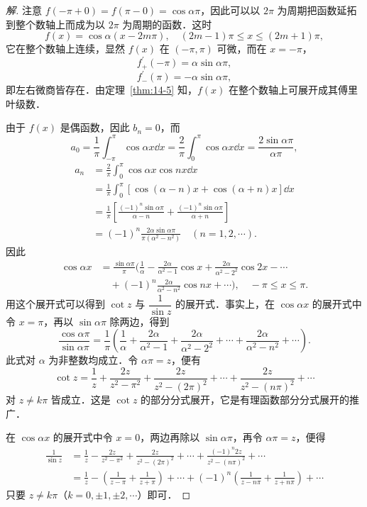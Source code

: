 \begin{proof}[解]
注意 $f(-\pi+0)=f(\pi-0)=\cos\alpha\pi$，因此可以以 $2\pi$ 为周期把函数延拓到整个数轴上而成为以 $2\pi$ 为周期的函数．这时
\[
f(x)=\cos\alpha(x-2m\pi),\quad(2m-1)\pi\leqslant x\leqslant(2m+1)\pi,
\]
它在整个数轴上连续，显然 $f(x)$ 在 $(-\pi,\pi)$ 可微，而在 $x=-\pi$，
\[
f_{+}^{\prime}(-\pi)=\alpha\sin\alpha\pi,
\]
\[
f_{-}^{\prime}(\pi)=-\alpha\sin\alpha\pi,
\]
即左右微商皆存在．由定理~\ref{thm:14-5} 知，$f(x)$ 在整个数轴上可展开成其傅里叶级数．

由于 $f(x)$ 是偶函数，因此 $b_{n}=0$，而
\[
a_{0}=\frac{1}{\pi}\int_{-\pi}^{\pi}\cos\alpha x\dd x=\frac{2}{\pi}\int_{0}^{\pi}\cos\alpha x\dd x=\frac{2\sin\alpha\pi}{\alpha\pi},
\]
\[
\begin{aligned}
a_{n}&=\frac{2}{\pi}\int_{0}^{\pi}\cos\alpha x\cos nx\dd x\\
&=\frac{1}{\pi}\int_{0}^{\pi}\left[\cos(\alpha-n)x+\cos(\alpha+n)x\right]\dd x\\
&=\frac{1}{\pi}\left[\frac{(-1)^{n}\sin\alpha\pi}{\alpha-n}+\frac{(-1)^{n}\sin\alpha\pi}{\alpha+n}\right]\\
&=(-1)^{n}\frac{2\alpha\sin\alpha\pi}{\pi(\alpha^{2}-n^{2})}\quad(n=1,2,\cdots).
\end{aligned}
\]
因此
\[
\begin{aligned}
\cos\alpha x&=\frac{\sin\alpha\pi}{\pi}\Bigg(\frac{1}{\alpha}-\frac{2\alpha}{\alpha^{2}-1}\cos x+\frac{2\alpha}{\alpha^{2}-2^{2}}\cos 2x-\cdots\\
&\quad+(-1)^{n}\frac{2\alpha}{\alpha^{2}-n^{2}}\cos nx+\cdots\Bigg),\quad-\pi\leqslant x\leqslant\pi.
\end{aligned}
\]
用这个展开式可以得到 $\cot z$ 与 $\dfrac{1}{\sin z}$ 的展开式．事实上，在 $\cos\alpha x$ 的展开式中令 $x=\pi$，再以 $\sin\alpha\pi$ 除两边，得到
\[
\frac{\cos\alpha\pi}{\sin\alpha\pi}=\frac{1}{\pi}\left(\frac{1}{\alpha}+\frac{2\alpha}{\alpha^{2}-1}+\frac{2\alpha}{\alpha^{2}-2^{2}}+\cdots+\frac{2\alpha}{\alpha^{2}-n^{2}}+\cdots\right).
\]
此式对 $\alpha$ 为非整数均成立．令 $\alpha\pi=z$，便有
\[
\cot z=\frac{1}{z}+\frac{2z}{z^{2}-\pi^{2}}+\frac{2z}{z^{2}-(2\pi)^{2}}+\cdots+\frac{2z}{z^{2}-(n\pi)^{2}}+\cdots
\]
对 $z\neq k\pi$ 皆成立．这是 $\cot z$ 的部分分式展开，它是有理函数部分分式展开的推广．

在 $\cos\alpha x$ 的展开式中令 $x=0$，两边再除以 $\sin\alpha\pi$，再令 $\alpha\pi=z$，便得
\[
\begin{aligned}
\frac{1}{\sin z}&=\frac{1}{z}-\frac{2z}{z^{2}-\pi^{2}}+\frac{2z}{z^{2}-(2\pi)^{2}}+\cdots+\frac{(-1)^{n}2z}{z^{2}-(n\pi)^{2}}+\cdots\\
&=\frac{1}{z}-\left(\frac{1}{z-\pi}+\frac{1}{z+\pi}\right)+\cdots+(-1)^{n}\left(\frac{1}{z-n\pi}+\frac{1}{z+n\pi}\right)+\cdots
\end{aligned}
\]
只要 $z\neq k\pi$（$k=0,\pm 1,\pm 2,\cdots$）即可．
\end{proof}


